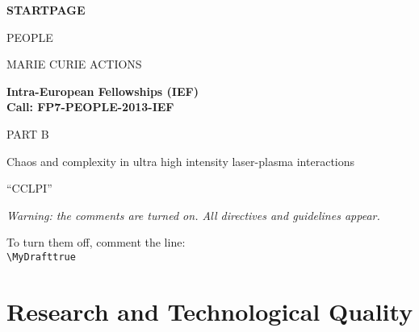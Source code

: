 \documentclass[a4paper,11pt]{article}
\title{\mytitle}
\newif\ifMyDraft%
\newcommand{\projectname}[0]{CCLPI}
\newcommand{\mytitle}{Chaos and complexity in ultra high intensity laser-plasma interactions}
\newenvironment{xcomment}{\em}{}
\newcommand{\cover}[1]{%
\newpage
\begin{center}
\vspace{4cm}
\textbf{#1}
\vspace{4cm}

PEOPLE

MARIE CURIE ACTIONS

\vspace{1cm}

\textbf{Intra-European Fellowships (IEF)}\\
\textbf{Call: FP7-PEOPLE-2013-IEF}

\vspace{4cm}

\Large{PART B}
\vspace{2cm}

\Huge{\mytitle}

\vspace{1cm}

\Large{``\projectname''}

\end{center}
\newpage
}
\begin{document}
\cover{STARTPAGE}

\newpage

\begin{xcomment} 
Warning: the comments are turned on. All directives and guidelines appear.

To turn them off, comment the line:\\ 
\verb|\MyDrafttrue|\\

\end{xcomment} 


\section{Research and Technological Quality}
\end{document}
